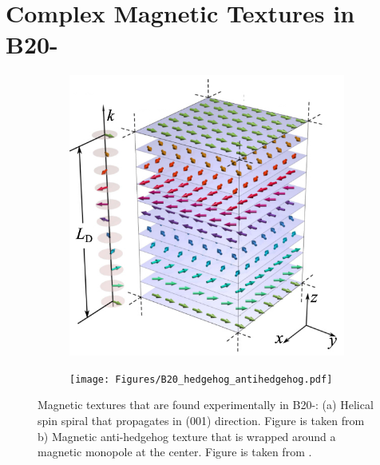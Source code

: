 \documentclass [a4paper, 12pt]{article}
\begin{document}
\section{Complex Magnetic Textures in B20-}
\label{sec:mnge}
\begin{figure}[h]
\centering
\begin{subfigure}[b]{0.49\textwidth}
   \includegraphics[width=\textwidth]{Figures/helicalspiral.png}
   \caption{}
   \label{fig:mnge_spiral}
\end{subfigure}
\begin{subfigure}[b]{0.49\textwidth}
	\texttt{[image: Figures/B20\_hedgehog\_antihedgehog.pdf]}
   \caption{}
   \label{fig:mnge_3q}
\end{subfigure}
	\caption{Magnetic textures that are found experimentally in B20-:  (a) Helical
	spin spiral that propagates in (001) direction. Figure is taken from \cite{rybakov_new_2016} b) 
	Magnetic anti-hedgehog texture that is wrapped around a magnetic monopole at the center.
	Figure is taken from \cite{zhang_electric_2016}.}
\label{fig:mnge_spiral_and_3q}
\end{figure}
\end{document}
